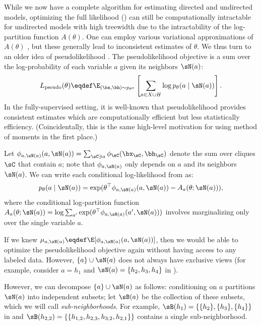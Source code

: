 While we now have a complete algorithm for estimating directed and undirected
models, optimizing the full likelihood ()
can still be computationally intractable for undirected models with high treewidth
due to the intractability of the log-partition function $A(\theta)$.
One can employ various variational approximations of $A(\theta)$ \cite{wainwright08varinf},
but these generally lead to inconsistent estimates of $\theta$.
We thus turn to an older idea of pseudolikelihood \citep{besag75pseudo}.
The pseudolikelihood objective is a sum over the log-probability of each
variable $a$ given its neighbors $\sN(a)$:
\begin{align}
  \label{eqn:pseudolikelihood}
  L_\text{pseudo}(\theta) \eqdef \E_{(\bx,\bh) \sim p_{\theta^*}}\left[\sum_{a \in X \cup H} \log p_\theta(a \mid \sN(a))\right].
\end{align}
In the fully-supervised setting, it is well-known that pseudolikelihood
provides consistent estimates which are computationally efficient
but less statistically efficiency.
(Coincidentally, this is the same high-level motivation for using method of
moments in the first place.)

Let $\phi_{a,\sN(a)}(a, \sN(a)) = \sum_{\sC \ni a} \phi_\sC(\bx_\sC,\bh_\sC)$
denote the sum over cliques $\sC$ that contain $a$; note that $\phi_{a, \sN(a)}$ only depends on $a$ and its neighbors $\sN(a)$.
We can write each conditional log-likelihood from  as:
\begin{align*}
p_\theta(a \mid \sN(a)) = \exp(\theta^\top\phi_{a,\sN(a)}(a, \sN(a)) - A_a(\theta; \sN(a))),
\end{align*}
where the conditional log-partition function $A_a(\theta; \sN(a)) = \log \sum_{a'} \exp(\theta^\top\phi_{a,\sN(a)}(a', \sN(a)))$
involves marginalizing only over the single variable $a$.

If we knew $\mu_{a,\sN(a)} \eqdef \E[\phi_{a,\sN(a)}(a,\sN(a))]$,
then we would be able to optimize the pseudolikelihood objective again without
having access to any labeled data.
However, $\{a\}\cup\sN(a)$ does not always have exclusive views
(for example, consider $a = h_1$ and $\sN(a) = \{h_2,h_3,h_4\}$ in ).

However, we can decompose $\{a\}\cup\sN(a)$ as follows:
conditioning on $a$ partitions $\sN(a)$ into independent subsets;
let $\sB(a)$ be the collection of these subsets,
which we will call \emph{sub-neighborhoods}.
For example, $\sB(h_1) = \{ \{h_2\},\{h_3\},\{h_4\} \}$ in 
and $\sB(h_{2,2}) = \{ \{ h_{1,2}, h_{2,3}, h_{3,2}, h_{2,1} \} \}$ contains a single sub-neighborhood.

